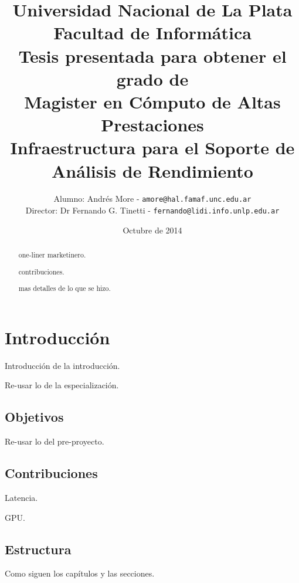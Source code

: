 \documentclass[a4paper]{report}
\begin{document}
\renewcommand{\tablename}{Tabla}

\title{Universidad Nacional de La Plata\\Facultad de Informática\\ \bigskip
{\large Tesis presentada para obtener el grado de \\}  Magister en Cómputo de Altas Prestaciones\\ \bigskip
  Infraestructura para el Soporte de Análisis de Rendimiento}

\author{
  Alumno: Andrés More - {\tt amore@hal.famaf.unc.edu.ar}\\
  Director: Dr Fernando G. Tinetti - {\tt fernando@lidi.info.unlp.edu.ar}
}

\date{Octubre de 2014}

\maketitle

\begin{abstract}
one-liner marketinero.

contribuciones.

mas detalles de lo que se hizo.
\end{abstract}

\tableofcontents

\chapter{Introducción}

Introducción de la introducción.

Re-usar lo de la especialización.

\section{Objetivos}

Re-usar lo del pre-proyecto.

\section{Contribuciones}

Latencia.

GPU.

\section{Estructura}

Como siguen los capítulos y las secciones.
\end{document}
